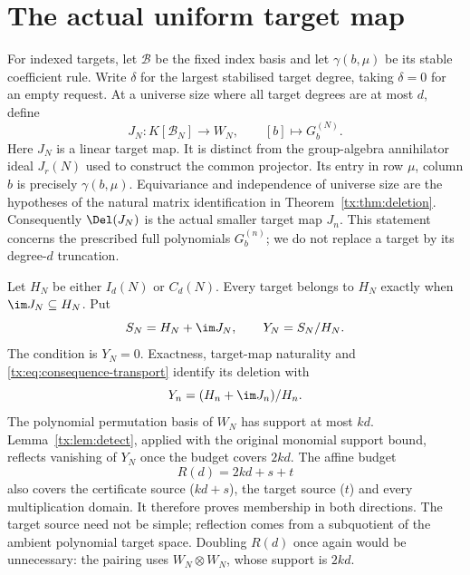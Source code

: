 \documentclass[11pt,a4paper,oneside,openany]{book}
\theoremstyle{definition}\newtheorem{definition}[theorem]{Definition}
\theoremstyle{remark}\newtheorem{remark}[theorem]{Remark}
\numberwithin{equation}{chapter}
\begin{document}
\section{The actual uniform target map}\label{tx:sec:target-transfer}
For indexed targets, let $\mathcal B$ be the fixed index basis and
let $\gamma(b,\mu)$ be its stable coefficient rule. Write $\delta$ for the largest stabilised target degree, taking
$\delta=0$ for an empty request. At a universe size where
all target degrees are at most $d$, define
\[
 J_N:K[\mathcal B_N]\longrightarrow W_N,\qquad
                [b]\longmapsto G_b^{(N)}.
\]
Here $J_N$ is a linear target map. It is distinct from the group-algebra
annihilator ideal $J_r(N)$ used to construct the common projector.
Its entry in row $\mu$, column $b$ is precisely $\gamma(b,\mu)$.
Equivariance and independence of universe size are the hypotheses of the natural
matrix identification in Theorem~\ref{tx:thm:deletion}. Consequently
$\Del(J_N)$ is the actual smaller target map $J_n$.
This statement concerns the prescribed full polynomials $G_b^{(n)}$;
we do not replace a target by its degree-$d$ truncation.

Let $H_N$ be either $I_d(N)$ or $C_d(N)$. Every target belongs to
$H_N$ exactly when $\im J_N\subseteq H_N$. Put
\[
          S_N=H_N+\im J_N,\qquad Y_N=S_N/H_N.
\]
The condition is $Y_N=0$. Exactness, target-map naturality and
\eqref{tx:eq:consequence-transport} identify its deletion with
\[
          Y_n=(H_n+\im J_n)/H_n.
\]
The polynomial permutation basis of $W_N$ has support at most $kd$.
Lemma~\ref{tx:lem:detect}, applied with the original monomial support bound,
reflects vanishing of $Y_N$ once the budget covers $2kd$.
The affine budget
\[
                            R(d)=2kd+s+t
\]
also covers the certificate source ($kd+s$), the target source ($t$)
and every multiplication domain. It therefore proves membership in
both directions. The target source need not be simple; reflection
comes from a subquotient of the ambient polynomial target space.
Doubling $R(d)$ once again would be unnecessary: the pairing uses
$W_N\otimes W_N$, whose support is $2kd$.
\end{document}
